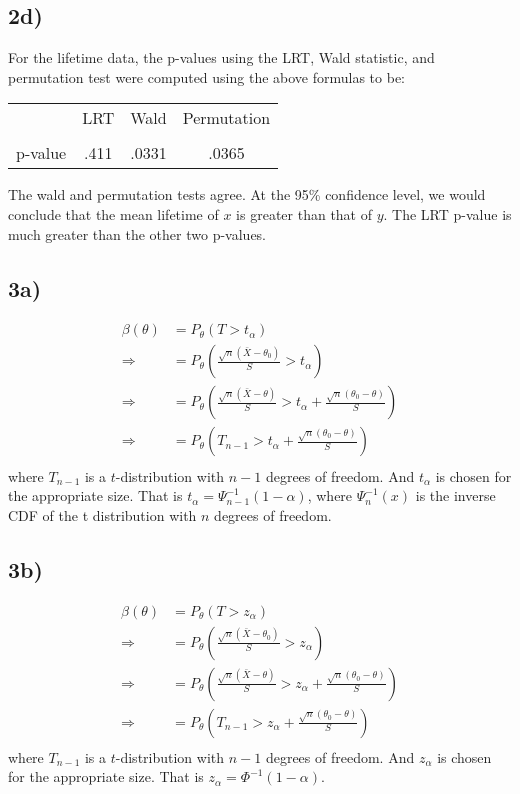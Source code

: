 \documentclass[11pt]{article}
\def\hline{ \textcolor{lgrey}{\hrulefill} }
\begin{document}
\subsection*{2d)}
For the lifetime data, the p-values using the LRT, Wald statistic, and
permutation test were computed using the above formulas to be:

\begin{center}
\begin{tabular}{c|ccc}
  & LRT & Wald & Permutation \\
  \hline & \hline & \hline & \hline \\
  p-value  & .411 & .0331 &.0365
\end{tabular}
\end{center}

\noindent
The wald and permutation tests agree. At the 95\% confidence level, we would 
conclude that the mean lifetime of $x$ is greater than that of $y$. 
The LRT p-value is much greater than the other two p-values. 

\subsection*{3a)}
\[
\begin{aligned}
  \beta(\theta) &= P_\theta(T>t_\alpha) \\
  \Rightarrow &= P_\theta(\frac{\sqrt{n} (\bar X - \theta_0) }{S} > t_\alpha) \\
  \Rightarrow &= P_\theta(\frac{\sqrt{n} (\bar X - \theta) }{S} > t_\alpha + \frac{\sqrt{n} (\theta_0-\theta)}{S}) \\
  \Rightarrow &= P_\theta(T_{n-1} > t_\alpha + \frac{\sqrt{n} (\theta_0-\theta)}{S}) \\
\end{aligned}
\]
where $T_{n-1}$ is a $t$-distribution with $n-1$ degrees of freedom. And
$t_\alpha$ is chosen for the appropriate size.  That is $t_\alpha =
\Psi_{n-1}^{-1}(1-\alpha)$, where $\Psi_{n}^{-1}(x)$ is the inverse CDF of the
t distribution with $n$ degrees of freedom.


\subsection*{3b)}
\[
\begin{aligned}
  \beta(\theta) &= P_\theta(T>z_\alpha) \\
  \Rightarrow &= P_\theta(\frac{\sqrt{n} (\bar X - \theta_0) }{S} > z_\alpha) \\
  \Rightarrow &= P_\theta(\frac{\sqrt{n} (\bar X - \theta) }{S} > z_\alpha + \frac{\sqrt{n} (\theta_0-\theta)}{S}) \\
  \Rightarrow &= P_\theta(T_{n-1} > z_\alpha + \frac{\sqrt{n} (\theta_0-\theta)}{S}) \\
\end{aligned}
\]
where $T_{n-1}$ is a $t$-distribution with $n-1$ degrees of freedom. And $z_\alpha$ is chosen for the appropriate size.
That is $z_\alpha = \Phi^{-1}(1-\alpha)$.
\end{document}
